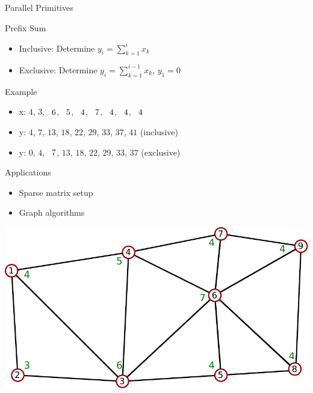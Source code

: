 \begin{frame}[fragile]{Parallel Primitives}

\begin{minipage}{0.7\textwidth}
\begin{block}{Prefix Sum}
  \begin{itemize}
   \item Inclusive: Determine $y_i = \sum_{k=1}^i x_k$
   \item Exclusive: Determine $y_i = \sum_{k=1}^{i-1} x_k$, $y_1 = 0$
  \end{itemize}
\end{block}

\begin{block}{Example}
 \begin{itemize}
  \item x: $4$, $3$,  $\hphantom{1}6$,  $\hphantom{1}5$,  $\hphantom{1}4$,  $\hphantom{1}7$,  $\hphantom{1}4$,  $\hphantom{1}4$,  $\hphantom{1}4$
  \item y: $4$, $7$,             $13$,             $18$,             $22$,             $29$,             $33$,             $37$,             $41$ (inclusive)
  \item y: $0$, $4$,  $\hphantom{1}7$,             $13$,             $18$,             $22$,             $29$,             $33$,             $37$ (exclusive)
 \end{itemize}

\end{block}

\begin{block}{Applications}
  \begin{itemize}
   \item Sparse matrix setup
   \item Graph algorithms
  \end{itemize}
\end{block}
\vspace*{1cm}
\end{minipage}
\begin{minipage}{0.2\textwidth}
\vspace*{4cm} \hspace*{-3.5cm}\includegraphics[width=2.8\textwidth]{figures/graph-1}
\end{minipage}

\end{frame}


